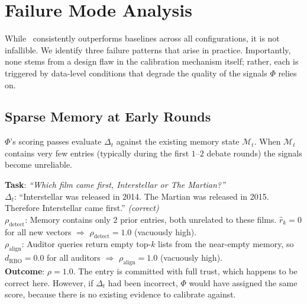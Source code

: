\section{Failure Mode Analysis}
\label{app:failure_mode}

While \system\ consistently outperforms baselines
across all configurations, it is not infallible.
We identify three failure patterns that arise in
practice.  Importantly, none stems from a design
flaw in the calibration mechanism itself; rather,
each is triggered by data-level conditions that
degrade the quality of the signals $\Phi$ relies on.

\subsection{Sparse Memory at Early Rounds}
\label{app:failure_sparse}

$\Phi$'s scoring passes evaluate $\Delta_t$ against
the existing memory state $\mathcal{M}_t$.  When
$\mathcal{M}_t$ contains very few entries (typically
during the first $1$--$2$ debate rounds) the
signals become unreliable.

\begin{tcolorbox}[colback=gray!5, colframe=gray!60,
  title={\small Example: HotpotQA, MemBank, Round 1},
  fonttitle=\bfseries\small, boxrule=0.4pt,
  arc=1.5mm]
\small
\textbf{Task}: \emph{``Which film came first,
Interstellar or The Martian?''}\\[3pt]
\textbf{$\Delta_t$}: ``Interstellar was released in
2014. The Martian was released in 2015.
Therefore Interstellar came first.''
\hfill\textit{(correct)}\\[3pt]
\textbf{$\rho_{\text{detect}}$}: Memory contains
only 2 prior entries, both unrelated to these films.
$\hat{r}_k = 0$ for all new vectors $\Rightarrow$
$\rho_{\text{detect}} = 1.0$ (vacuously high).\\[3pt]
\textbf{$\rho_{\text{align}}$}: Auditor queries
return empty top-$k$ lists from the near-empty
memory, so $d_{\text{RBO}} = 0.0$ for all auditors
$\Rightarrow$ $\rho_{\text{align}} = 1.0$
(vacuously high).\\[3pt]
\textbf{Outcome}: $\rho = 1.0$.  The entry is
committed with full trust, which happens to be
correct here.  However, if $\Delta_t$ had been
incorrect, $\Phi$ would have assigned the same score,
because there is no existing evidence to calibrate
against.
\end{tcolorbox}

